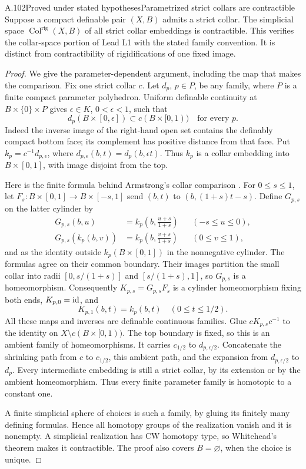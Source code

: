 \begin{saresult}{A.102}{Proved under stated hypotheses}{Parametrized strict collars are contractible}
Suppose a compact definable pair $(X,B)$ admits a strict collar.
The simplicial space $\operatorname{Col}^{\mathrm{rig}}(X,B)$ of all
strict collar embeddings is contractible. This verifies the collar-space
portion of Lead L1 with the stated family convention. It is distinct from
contractibility of rigidifications of one fixed image.
\end{saresult}
\begin{proof}
We give the parameter-dependent argument, including the map that makes
the comparison. Fix one strict collar $c$. Let $d_p$, $p\in P$, be any
family, where $P$ is a finite compact parameter polyhedron. Uniform
definable continuity at $B\times\{0\}\times P$ gives
$\epsilon\in K$, $0<\epsilon<1$, such that
\[
 d_p(B\times[0,\epsilon])\subset c(B\times[0,1))
 \quad\text{for every }p.
\]
Indeed the inverse image of the right-hand open set contains the
definably compact bottom face; its complement has positive distance
from that face. Put $k_p=c^{-1}d_{p,\epsilon}$, where
$d_{p,\epsilon}(b,t)=d_p(b,\epsilon t)$. Thus $k_p$ is a collar
embedding into $B\times[0,1]$, with image disjoint from the top.

Here is the finite formula behind Armstrong's collar comparison
\cite[Theorem 2, pp.~123--124]{Armstrong1970}. For $0\leq s\leq1$,
let $F_s:B\times[0,1]\to B\times[-s,1]$ send
$(b,t)$ to $(b,(1+s)t-s)$. Define $G_{p,s}$ on the latter cylinder by
\[
\begin{aligned}
 G_{p,s}(b,u)&=k_p\left(b,\frac{u+s}{1+s}\right)
 &&(-s\leq u\leq0),\\
 G_{p,s}(k_p(b,v))&=k_p\left(b,\frac{v+s}{1+s}\right)
 &&(0\leq v\leq1),
\end{aligned}
\]
and as the identity outside $k_p(B\times[0,1])$ in the nonnegative
cylinder. The formulas agree on their common boundary. Their images
partition the small collar into radii $[0,s/(1+s)]$ and
$[s/(1+s),1]$, so $G_{p,s}$ is a homeomorphism. Consequently
$K_{p,s}=G_{p,s}F_s$ is a cylinder homeomorphism fixing both ends,
$K_{p,0}=\operatorname{id}$, and
\[
 K_{p,1}(b,t)=k_p(b,t)\quad(0\leq t\leq1/2).
\]
All these maps and inverses are definable continuous families. Glue
$cK_{p,s}c^{-1}$ to the identity on $X\setminus c(B\times[0,1))$.
The top boundary is fixed, so this is an ambient family of homeomorphisms.
It carries $c_{1/2}$ to $d_{p,\epsilon/2}$. Concatenate the shrinking
path from $c$ to $c_{1/2}$, this ambient path, and the expansion from
$d_{p,\epsilon/2}$ to $d_p$. Every intermediate embedding is still a
strict collar, by its extension or by the ambient homeomorphism.
Thus every finite parameter family is homotopic to a constant one.

A finite simplicial sphere of choices is such a family, by gluing its
finitely many defining formulas. Hence all homotopy groups of the
realization vanish and it is nonempty. A simplicial realization has
CW homotopy type, so Whitehead's theorem makes it contractible.
The proof also covers $B=\varnothing$, when the choice is unique.
\end{proof}

